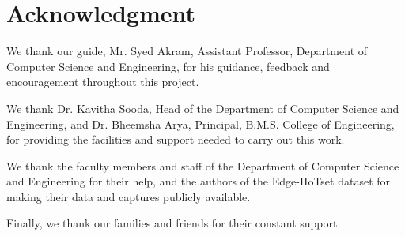 \documentclass[12pt,a4paper]{report}
\begin{document}
\chapter*{Acknowledgment}
\thispagestyle{empty}
We thank our guide, Mr. Syed Akram, Assistant Professor, Department of Computer Science and Engineering, for his guidance, feedback and encouragement throughout this project.

We thank Dr. Kavitha Sooda, Head of the Department of Computer Science and Engineering, and Dr. Bheemsha Arya, Principal, B.M.S. College of Engineering, for providing the facilities and support needed to carry out this work.

We thank the faculty members and staff of the Department of Computer Science and Engineering for their help, and the authors of the Edge-IIoTset dataset for making their data and captures publicly available.

Finally, we thank our families and friends for their constant support.
\newpage
\tableofcontents
\thispagestyle{empty}
\newpage
\listoffigures
\thispagestyle{empty}
\newpage
\listoftables
\thispagestyle{empty}

\clearpage
{}
\setcounter{page}{1}








\end{document}
